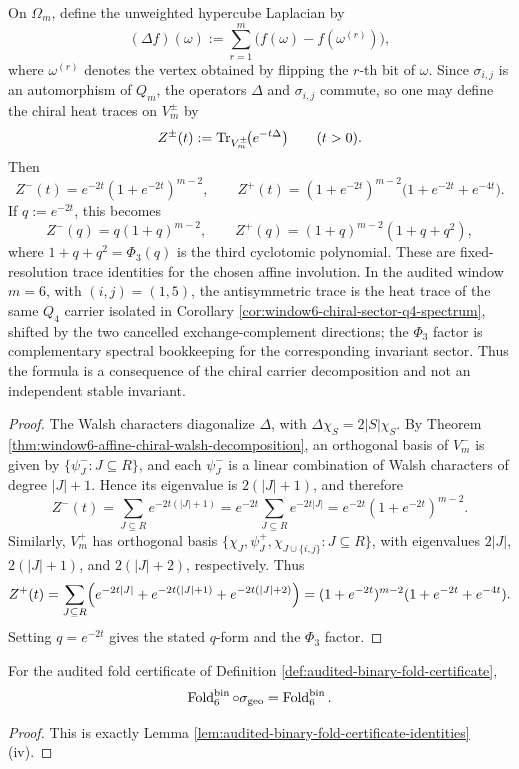 \begin{corollary}\label{thm:window6-chiral-heat-trace-phi3}
On \(\Omega_m\), define the unweighted hypercube Laplacian by
\[
(\Delta f)(\omega):=\sum_{r=1}^{m}\bigl(f(\omega)-f(\omega^{(r)})\bigr),
\]
where \(\omega^{(r)}\) denotes the vertex obtained by flipping the \(r\)-th bit of \(\omega\).
Since \(\sigma_{i,j}\) is an automorphism of \(Q_m\), the operators \(\Delta\) and \(\sigma_{i,j}\) commute, so one may define the chiral heat traces on \(V_m^\pm\) by
\[
Z^\pm(t):=\operatorname{Tr}_{V_m^\pm}\!\bigl(e^{-t\Delta}\bigr)\qquad(t>0).
\]
Then
\[
Z^-(t)=e^{-2t}(1+e^{-2t})^{m-2},
\qquad
Z^+(t)=(1+e^{-2t})^{m-2}\bigl(1+e^{-2t}+e^{-4t}\bigr).
\]
If \(q:=e^{-2t}\), this becomes
\[
Z^-(q)=q(1+q)^{m-2},
\qquad
Z^+(q)=(1+q)^{m-2}(1+q+q^2),
\]
where \(1+q+q^2=\Phi_3(q)\) is the third cyclotomic polynomial.
These are fixed-resolution trace identities for the chosen affine involution.  In the audited window \(m=6\), with \((i,j)=(1,5)\), the antisymmetric trace is the heat trace of the same \(Q_4\) carrier isolated in Corollary \ref{cor:window6-chiral-sector-q4-spectrum}, shifted by the two cancelled exchange-complement directions; the \(\Phi_3\) factor is complementary spectral bookkeeping for the corresponding invariant sector.  Thus the formula is a consequence of the chiral carrier decomposition and not an independent stable invariant.
\end{corollary}
\begin{proof}
The Walsh characters diagonalize \(\Delta\), with
\(
\Delta\chi_S=2|S|\chi_S
\).
By Theorem \ref{thm:window6-affine-chiral-walsh-decomposition}, an orthogonal basis of \(V_m^-\) is given by \(\{\psi_J^-:J\subseteq R\}\), and each \(\psi_J^-\) is a linear combination of Walsh characters of degree \(|J|+1\).
Hence its eigenvalue is \(2(|J|+1)\), and therefore
\[
Z^-(t)=\sum_{J\subseteq R}e^{-2t(|J|+1)}
=e^{-2t}\sum_{J\subseteq R}e^{-2t|J|}
=e^{-2t}(1+e^{-2t})^{m-2}.
\]
Similarly, \(V_m^+\) has orthogonal basis \(\{\chi_J,\psi_J^+,\chi_{J\cup\{i,j\}}:J\subseteq R\}\), with eigenvalues \(2|J|\), \(2(|J|+1)\), and \(2(|J|+2)\), respectively.
Thus
\[
Z^+(t)=\sum_{J\subseteq R}\Bigl(e^{-2t|J|}+e^{-2t(|J|+1)}+e^{-2t(|J|+2)}\Bigr)
=(1+e^{-2t})^{m-2}(1+e^{-2t}+e^{-4t}).
\]
Setting \(q=e^{-2t}\) gives the stated \(q\)-form and the \(\Phi_3\) factor. \qedhere
\end{proof}

\begin{lemma}\label{lem:window6-geometric-stabilizer-audit}
For the audited fold certificate of Definition \ref{def:audited-binary-fold-certificate},
\[
\operatorname{Fold}_6^{\mathrm{bin}}\circ\sigma_{\mathrm{geo}}=\operatorname{Fold}_6^{\mathrm{bin}}.
\]
\end{lemma}
\begin{proof}
This is exactly Lemma \ref{lem:audited-binary-fold-certificate-identities}\textup{(iv)}. \qedhere
\end{proof}

